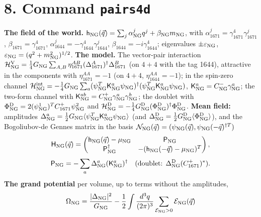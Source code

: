 \documentclass[
  10pt,
]{article}
\begin{document}
\hypertarget{command-pairs4d}{%
\section{\texorpdfstring{8. Command
\texttt{pairs4d}}{8. Command pairs4d}}\label{command-pairs4d}}

\textbf{The field of the world.}
\(\mathsf h_{\rm NG}(\vec q)=\sum_j\alpha^j_{\rm NG}q^j+\beta_{\rm NG}m_{\rm NG}\),
with \(\alpha^j_{1671}=\gamma^4_{1671}\gamma^j_{1671}\),
\(\beta_{1671}=\gamma^4_{1671}\),
\(\alpha^j_{1644}=-\gamma^4_{1644}\gamma^j_{1644}\),
\(\beta_{1644}=-i\gamma^4_{1644}\); eigenvalues
\(\pm\varepsilon_{\rm NG}\),
\(\varepsilon_{\rm NG}=(q^2+m_{\rm NG}^2)^{1/2}\). \textbf{The model.}
The vector-pair interaction
\(\mathcal H^{\rm V}_{\rm NG}=\tfrac14G_{\rm NG}\sum_{A,B}\eta^{AB}_{1671}(\Delta^A_{1671})^\dagger\Delta^B_{1671}\)
(on \(4+4\) with the tag 1644), attractive in the components with
\(\eta^{AA}_{1671}=-1\) (on \(4+4\), \(\eta^{AA}_{1644}=-1\)); in the
spin-zero channel
\(\mathcal H^{\rm int}_{\rm NG}=-\tfrac14G_{\rm NG}\sum_a(\psi^T_{\rm NG}\mathsf K^a_{\rm NG}\psi_{\rm NG})^\dagger(\psi^T_{\rm NG}\mathsf K^a_{\rm NG}\psi_{\rm NG})\),
\(\mathsf K^a_{\rm NG}=C^-_{\rm NG}\gamma^a_{\rm NG}\); the two-form
channel with
\(\mathsf K^{ab}_{\rm NG}=C^+_{\rm NG}\gamma^a_{\rm NG}\gamma^b_{\rm NG}\);
the doublet with
\(\Phi^{\rm D}_{\rm NG}=2(\psi^1_{\rm NG})^TC^+_{1671}\psi^2_{\rm NG}\)
and
\(\mathcal H^{\rm D}_{\rm NG}=-\tfrac14G^{\rm D}_{\rm NG}(\Phi^{\rm D}_{\rm NG})^\dagger\Phi^{\rm D}_{\rm NG}\).
\textbf{Mean field:} amplitudes
\(\Delta^a_{\rm NG}=\tfrac12G_{\rm NG}\langle\psi^T_{\rm NG}\mathsf K^a_{\rm NG}\psi_{\rm NG}\rangle\)
(and
\(\Delta^{\rm D}_{\rm NG}=\tfrac12G^{\rm D}_{\rm NG}\langle\Phi^{\rm D}_{\rm NG}\rangle\)),
and the Bogoliubov-de Gennes matrix in the basis
\(\mathcal N_{\rm NG}(\vec q)=(\psi_{\rm NG}(\vec q),\psi_{\rm NG}(-\vec q)^{\dagger T})\)
\[\mathsf H_{\rm NG}(\vec q)=\begin{pmatrix}\mathsf h_{\rm NG}(\vec q)-\mu_{\rm NG}&\mathsf P_{\rm NG}\\\mathsf P_{\rm NG}^\dagger&-(\mathsf h_{\rm NG}(-\vec q)-\mu_{\rm NG})^T\end{pmatrix},\]
\[\mathsf P_{\rm NG}=-\sum_a\Delta^a_{\rm NG}(\mathsf K^a_{\rm NG})^\dagger\quad(\text{doublet: }\Delta^{\rm D}_{\rm NG}(C^+_{1671})^*).\]
\textbf{The grand potential} per volume, up to terms without the
amplitudes,
\[\Omega_{\rm NG}=\frac{\lvert\Delta_{\rm NG}\rvert^2}{G_{\rm NG}}-\frac12\int\frac{d^3q}{(2\pi)^3}\sum_{\mathcal E_{\rm NG}>0}\mathcal E_{\rm NG}(\vec q)\]
\end{document}
